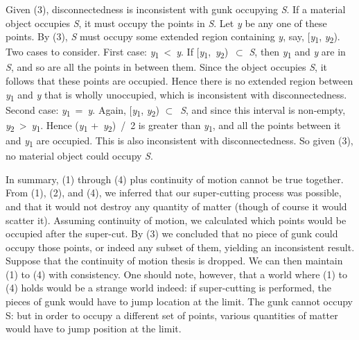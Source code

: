 Given (3), disconnectedness is inconsistent with gunk occupying \textit{S}. If a material object occupies \textit{S}, it must occupy the points in \textit{S}. Let \textit{y} be any one of these points. By (3), \textit{S} must occupy some extended region containing \textit{y}, say, [\textit{y}\textsubscript{1}, \textit{y}\textsubscript{2}). Two cases to consider. First case: \textit{y}\textsubscript{1}~{\textless}~\textit{y}. If [\textit{y}\textsubscript{1},~\textit{y}\textsubscript{2})~${\subset}$ \textit{S}, then \textit{y}\textsubscript{1} and \textit{y} are in \textit{S}, and so are all the points in between them. Since the object occupies \textit{S}, it follows that these points are occupied. Hence there is no extended region between \textit{y}\textsubscript{1} and \textit{y} that is wholly unoccupied, which is inconsistent with disconnectedness. Second case: \textit{y}\textsubscript{1}~=~\textit{y}. Again, [\textit{y}\textsubscript{1}, \textit{y}\textsubscript{2}) ${\subset}$~\textit{S}, and since this interval is non\nobreakdash-empty, \textit{y}\textsubscript{2}~{\textgreater}~\textit{y}\textsubscript{1}. Hence (\textit{y}\textsubscript{1} +~\textit{y}\textsubscript{2})~/~2 is greater than \textit{y}\textsubscript{1}, and all the points between it and \textit{y}\textsubscript{1} are occupied. This is also inconsistent with disconnectedness. So given (3), no material object could occupy \textit{S}.

In summary, (1) through (4) plus continuity of motion cannot be true together. From (1), (2), and (4), we inferred that our super-cutting process was possible, and that it would not destroy any quantity of matter (though of course it would scatter it). Assuming continuity of motion, we calculated which points would be occupied after the super-cut. By (3) we concluded that no piece of gunk could occupy those points, or indeed any subset of them, yielding an inconsistent result. Suppose that the continuity of motion thesis is dropped. We can then maintain (1) to (4) with consistency. One should note, however, that a world where (1) to (4) holds would be a strange world indeed: if super-cutting is performed, the pieces of gunk would have to jump location at the limit. The gunk cannot occupy S: but in order to occupy a different set of points, various quantities of matter would have to jump position at the limit.  

